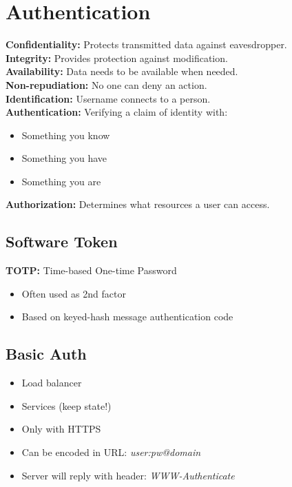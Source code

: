 \usepackage{graphicx}%

\section{Authentication}
\textbf{Confidentiality:} Protects transmitted data against eavesdropper.\\
\textbf{Integrity:} Provides protection against modification.\\
\textbf{Availability:} Data needs to be available when needed.\\
\textbf{Non-repudiation:} No one can deny an action.\\
\textbf{Identification:} Username connects to a person.\\
\textbf{Authentication:} Verifying a claim of identity with:
\begin{itemize}
    \item Something you know
    \item Something you have
    \item Something you are
\end{itemize}
\textbf{Authorization:} Determines what resources a user can access.\\

\subsection{Software Token}
\textbf{TOTP:} Time-based One-time Password
\begin{itemize}
    \item Often used as 2nd factor
    \item Based on keyed-hash message authentication code
\end{itemize}

\subsection{Basic Auth}
\begin{itemize}
    \item Load balancer
    \item Services (keep state!)
    \item Only with HTTPS
    \item Can be encoded in URL: \textit{user:pw@domain}
    \item Server will reply with header: \textit{WWW-Authenticate}
\end{itemize}

